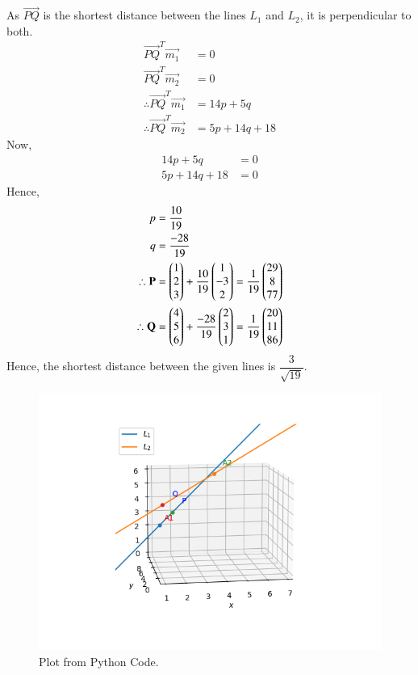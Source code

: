 \documentclass[journal,12pt,twocolumn]{IEEEtran}
\begin{document}
As $\vec{PQ}$ is the shortest distance between the lines $L_1$ and $L_2$, it is perpendicular to both.
\begin{align}
    \vec{PQ}^T\vec{m_1} &= 0\\
    \vec{PQ}^T\vec{m_2} &= 0\\
    \therefore \vec{PQ}^T\vec{m_1} &= 14p + 5q\\
    \therefore \vec{PQ}^T\vec{m_2} &= 5p + 14q + 18
\end{align}
Now,
\begin{align}
    14p + 5q &= 0\\
    5p + 14q + 18 &= 0
\end{align}
Hence,
\begin{align}
    p &= \frac{10}{19}\\ q &= \frac{-28}{19}\\
    \therefore \mathbf{P} &= \begin{pmatrix}1\\2\\3\end{pmatrix} + \frac{10}{19} \begin{pmatrix}1\\-3\\2\end{pmatrix} = \frac{1}{19}\begin{pmatrix}29\\8\\77\end{pmatrix}\\
    \therefore \mathbf{Q} &= \begin{pmatrix}4\\5\\6\end{pmatrix} + \frac{-28}{19} \begin{pmatrix}2\\3\\1\end{pmatrix} = \frac{1}{19}\begin{pmatrix}20\\11\\86\end{pmatrix}
\end{align}
Hence, the shortest distance between the given lines is $\dfrac{3}{\sqrt{19}}$.
\begin{figure}[h]
    \centering
    \includegraphics[scale = 0.5]{figure/Figure_1.png}
    \caption{Plot from Python Code.}
    \label{fig:my_label}
\end{figure}
\end{document}
